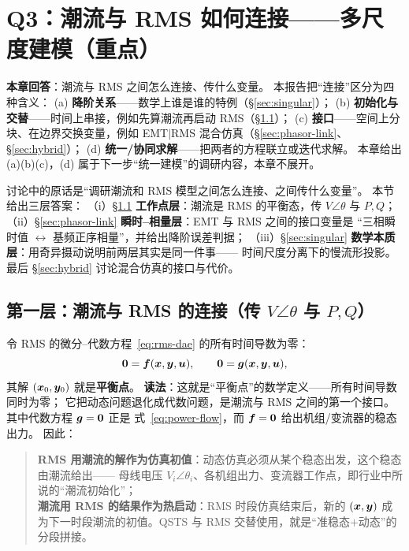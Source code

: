 \section{Q3：潮流与 RMS 如何连接——多尺度建模（重点）}
\label{sec:q3}

\noindent\textbf{本章回答}：潮流与 RMS 之间怎么连接、传什么变量。
本报告把“连接”区分为四种含义：
(a) \textbf{降阶关系}——数学上谁是谁的特例（\S\ref{sec:singular}）；
(b) \textbf{初始化与交替}——时间上串接，例如先算潮流再启动 RMS（\S\ref{sec:workpoint}）；
(c) \textbf{接口}——空间上分块、在边界交换变量，例如 EMT$|$RMS 混合仿真（\S\ref{sec:phasor-link}、\S\ref{sec:hybrid}）；
(d) \textbf{统一/协同求解}——把两者的方程联立或迭代求解。
本章给出 (a)(b)(c)，(d) 属于下一步“统一建模”的调研内容，本章不展开。

讨论中的原话是“调研潮流和 RMS 模型之间怎么连接、之间传什么变量”。
本节给出三层答案：
（i）\S\ref{sec:workpoint} \textbf{工作点层}：潮流是 RMS 的平衡态，传 $V\angle\theta$ 与 $P,Q$；
（ii）\S\ref{sec:phasor-link} \textbf{瞬时--相量层}：EMT 与 RMS 之间的接口变量是
“三相瞬时值 $\leftrightarrow$ 基频正序相量”，并给出降阶误差判据；
（iii）\S\ref{sec:singular} \textbf{数学本质层}：用奇异摄动说明前两层其实是同一件事——
时间尺度分离下的慢流形投影。最后 \S\ref{sec:hybrid} 讨论混合仿真的接口与代价。

\subsection{第一层：潮流与 RMS 的连接（传 $V\angle\theta$ 与 $P,Q$）}
\label{sec:workpoint}

令 RMS 的微分--代数方程~\eqref{eq:rms-dae} 的所有时间导数为零：
\begin{equation}
\bm{0}=\bm{f}(\bm{x},\bm{y},\bm{u}),\qquad \bm{0}=\bm{g}(\bm{x},\bm{y},\bm{u}),
\label{eq:rms-equilibrium}
\end{equation}
其解 $(\bm{x}_0,\bm{y}_0)$ 就是\textbf{平衡点}。
\textbf{读法}：这就是“平衡点”的数学定义——所有时间导数同时为零；
它把动态问题退化成代数问题，是潮流与 RMS 之间的第一个接口。其中代数方程 $\bm{g}=\bm{0}$ 正是
式~\eqref{eq:power-flow}，而 $\bm{f}=\bm{0}$ 给出机组/变流器的稳态出力。
因此：

\begin{quote}
\textbf{RMS 用潮流的解作为仿真初值}：动态仿真必须从某个稳态出发，这个稳态由潮流给出——
母线电压 $V_i\angle\theta_i$、各机组出力、变流器工作点，即行业中所说的“潮流初始化”；\\
\textbf{潮流用 RMS 的结果作为热启动}：RMS 时段仿真结束后，新的 $(\bm{x},\bm{y})$
成为下一时段潮流的初值。QSTS 与 RMS 交替使用，就是“准稳态$+$动态”的分段拼接。
\end{quote}

